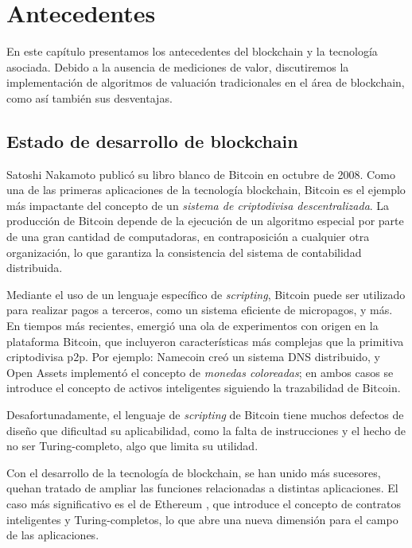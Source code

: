 
\section{Antecedentes}
En este capítulo presentamos los antecedentes del blockchain y la tecnología asociada. Debido a la ausencia de mediciones de valor, discutiremos la implementación de algoritmos de valuación tradicionales en el área de blockchain, como así también sus desventajas.

\subsection{Estado de desarrollo de blockchain}

Satoshi Nakamoto publicó su libro blanco de Bitcoin \cite{Nakamoto2008} en octubre de 2008. Como una de las primeras aplicaciones de la tecnología blockchain, Bitcoin es el ejemplo más impactante del concepto de un \emph{sistema de criptodivisa descentralizada}. La producción de Bitcoin depende de la ejecución de un algoritmo especial por parte de una gran cantidad de computadoras, en contraposición a cualquier otra organización, lo que garantiza la consistencia del sistema de contabilidad distribuida.

Mediante el uso de un lenguaje específico de \textit{scripting}, Bitcoin puede ser utilizado para realizar pagos a terceros, como un sistema eficiente de micropagos, y más. En tiempos más recientes, emergió una ola de experimentos con origen en la plataforma Bitcoin, que incluyeron características más complejas que la primitiva criptodivisa p2p. Por ejemplo: Namecoin \cite{Namecoin} creó un sistema DNS distribuido, y Open Assets \cite{OpenAssets} implementó el concepto de \textit{monedas coloreadas}; en ambos casos se introduce el concepto de activos inteligentes siguiendo la trazabilidad de Bitcoin.

Desafortunadamente, el lenguaje de \textit{scripting} de Bitcoin tiene muchos defectos de diseño que dificultad su aplicabilidad, como la falta de instrucciones y el hecho de no ser Turing-completo, algo que limita su utilidad.

Con el desarrollo de la tecnología de blockchain, se han unido más sucesores, quehan tratado de ampliar las funciones relacionadas a distintas aplicaciones. El caso más significativo es el de Ethereum \cite{buterin2013ethereum}, que introduce el concepto de contratos inteligentes y Turing-completos, lo que abre una nueva dimensión para el campo de las aplicaciones.

